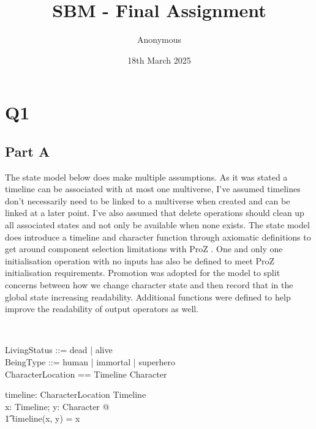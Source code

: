 \documentclass{article}
\title{SBM - Final Assignment}
\date{18th March 2025}
\author{Anonymous}
\begin{document}
\maketitle

\pagebreak 

\section*{Q1}

\subsection*{Part A}

The state model below does make multiple assumptions. As it was stated a timeline can be associated with at most one multiverse, I’ve assumed timelines don’t necessarily need to be linked to a multiverse when created and can be linked at a later point. I’ve also assumed that delete operations should clean up all associated states and not only be available when none exists.
\newline
\newline
The state model does introduce a timeline and character function through axiomatic definitions to get around component selection limitations with ProZ . One and only one initialisation operation with no inputs has also be defined to meet ProZ initialisation requirements.\newline
\newline
Promotion was adopted for the model to split concerns between how we change character state and then record that in the global state increasing readability. Additional functions were defined to help improve the readability of output operators as well.

\begin{zed}
 \\
\end{zed}
\begin{zed}
LivingStatus ::= dead | alive \\
BeingType ::= human | immortal | superhero \\
CharacterLocation == Timeline \cross Character \\
\end{zed}

\begin{axdef}
timeline: CharacterLocation \fun Timeline \\
\where
\forall x: Timeline; y: Character @ \\
\t1 timeline(x, y) = x \\
\end{axdef}
\end{document}
